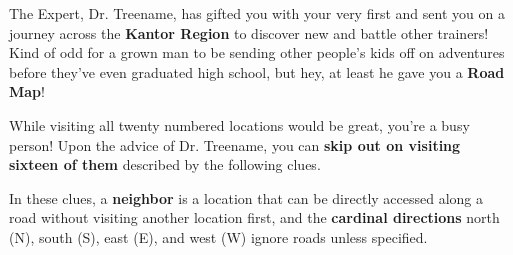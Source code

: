 

The \mappMobimon{} Expert, Dr. Treename, has gifted you with your very
first \mappMobimon{} and sent you on a journey across the
\textbf{Kantor Region} to discover new \mappMobimon{} and battle other
trainers! Kind of odd for a grown man to be sending other people's kids off
on adventures before they've even graduated high school, but hey, at least he
gave you a \textbf{Road Map}!

While visiting all twenty numbered locations would be great, you're a
busy person! Upon the advice of Dr. Treename, you can
\textbf{skip out on visiting sixteen of them} described by the following clues.

In these clues, a \textbf{neighbor} is a location that can be
directly accessed along a road without visiting another location first, and the
\textbf{cardinal directions} north (N), south (S), east (E), and west (W) ignore
roads unless specified.

